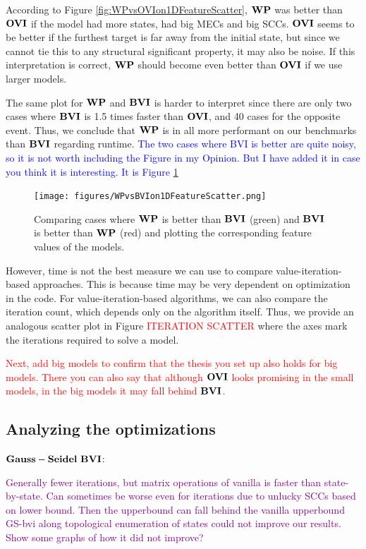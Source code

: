 According to Figure \ref{fig:WPvsOVIon1DFeatureScatter}, $\WP$ was better than $\mathbf{OVI}$ if the model had more states, had big MECs and big SCCs.
$\mathbf{OVI}$ seems to be better if the furthest target is far away from the initial state, but since we cannot tie this to any structural significant property,
it may also be noise. If this interpretation is correct, $\WP$ should become even better than $\mathbf{OVI}$ if we use larger models.

The same plot for $\WP$ and $\BVI$ is harder to interpret since there are only two cases where $\BVI$ is 1.5 times faster than $\mathbf{OVI}$, and 40 cases
for the opposite event. Thus, we conclude that $\WP$ is in all more performant on our benchmarks than $\BVI$ regarding runtime. 
\textcolor{blue}{The two cases where BVI is better are quite noisy, so it is not worth including the Figure in my Opinion.
But I have added it in case you think it is interesting. It is Figure \ref{fig:WPvsBVIon1DFeatureScatter}}

\begin{figure}[t]
    \centering
    \texttt{[image: figures/WPvsBVIon1DFeatureScatter.png]}
    \caption[$\WP$ compared to $\BVI$]{
        Comparing cases where $\WP$ is better than $\BVI$ (green) and $\BVI$ is better than $\WP$ (red) 
        and plotting the corresponding feature values of the models.
    }
    \label{fig:WPvsBVIon1DFeatureScatter}
\end{figure}


However, time is not the best measure we can use to compare value-iteration-based approaches. 
This is because time may be very dependent on optimization in the code. 
For value-iteration-based algorithms, we can also compare the iteration count, which depends only on the algorithm itself.
Thus, we provide an analogous scatter plot in Figure \textcolor{red}{ITERATION SCATTER} where the axes mark the iterations required to solve a model.

\textcolor{red}{Next, add big models to confirm that the thesis you set up also holds for big models. 
There you can also say that although $\mathbf{OVI}$ looks promising in the small models, in the big models it may fall behind $\BVI$.}

\subsection{Analyzing the optimizations}

$\mathbf{Gauss-Seidel} \ \mathbf{BVI}$:

\textcolor{purple}{Generally fewer iterations, but matrix operations of vanilla is faster than state-by-state.
Can sometimes be worse even for iterations due to unlucky SCCs based on lower bound. Then the upperbound can fall behind the vanilla upperbound
GS-bvi along topological enumeration of states could not improve our results. Show some graphs of how it did not improve?}

